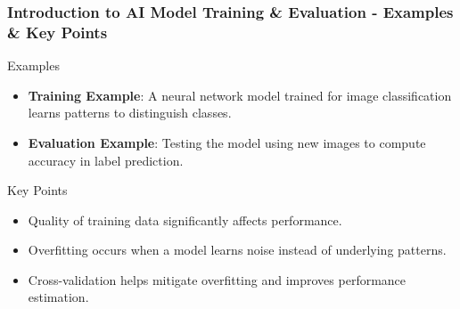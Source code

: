 \documentclass[aspectratio=169]{beamer}
\begin{document}
\begin{frame}[fragile]
    \frametitle{Introduction to AI Model Training \& Evaluation - Examples \& Key Points}

    \begin{block}{Examples}
        \begin{itemize}
            \item \textbf{Training Example}: A neural network model trained for image classification learns patterns to distinguish classes.
            \item \textbf{Evaluation Example}: Testing the model using new images to compute accuracy in label prediction.
        \end{itemize}
    \end{block}

    \begin{block}{Key Points}
        \begin{itemize}
            \item Quality of training data significantly affects performance.
            \item Overfitting occurs when a model learns noise instead of underlying patterns.
            \item Cross-validation helps mitigate overfitting and improves performance estimation.
        \end{itemize}
    \end{block}
    
\end{frame}
\end{document}
